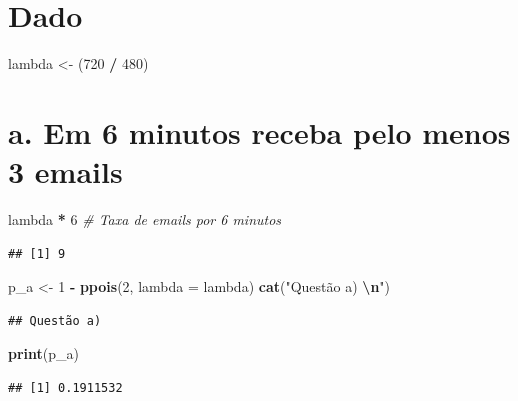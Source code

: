 \documentclass[
]{article}
\newenvironment{Shaded}{\begin{snugshade}}{\end{snugshade}}
\newcommand{\AttributeTok}[1]{\textcolor[rgb]{0.13,0.29,0.53}{#1}}
\newcommand{\CommentTok}[1]{\textcolor[rgb]{0.56,0.35,0.01}{\textit{#1}}}
\newcommand{\DecValTok}[1]{\textcolor[rgb]{0.00,0.00,0.81}{#1}}
\newcommand{\FunctionTok}[1]{\textcolor[rgb]{0.13,0.29,0.53}{\textbf{#1}}}
\newcommand{\NormalTok}[1]{#1}
\newcommand{\OtherTok}[1]{\textcolor[rgb]{0.56,0.35,0.01}{#1}}
\newcommand{\SpecialCharTok}[1]{\textcolor[rgb]{0.81,0.36,0.00}{\textbf{#1}}}
\newcommand{\StringTok}[1]{\textcolor[rgb]{0.31,0.60,0.02}{#1}}
\begin{document}
\section{Dado}\label{dado}

\begin{Shaded}
\begin{Highlighting}[]
\NormalTok{lambda }\OtherTok{\textless{}{-}}\NormalTok{ (}\DecValTok{720} \SpecialCharTok{/} \DecValTok{480}\NormalTok{)}
\end{Highlighting}
\end{Shaded}

\section{a. Em 6 minutos receba pelo menos 3
emails}\label{a.-em-6-minutos-receba-pelo-menos-3-emails}

\begin{Shaded}
\begin{Highlighting}[]
\NormalTok{lambda }\SpecialCharTok{*} \DecValTok{6}  \CommentTok{\# Taxa de emails por 6 minutos}
\end{Highlighting}
\end{Shaded}

\begin{verbatim}
## [1] 9
\end{verbatim}

\begin{Shaded}
\begin{Highlighting}[]
\NormalTok{p\_a }\OtherTok{\textless{}{-}} \DecValTok{1} \SpecialCharTok{{-}} \FunctionTok{ppois}\NormalTok{(}\DecValTok{2}\NormalTok{, }\AttributeTok{lambda =}\NormalTok{ lambda)}
\FunctionTok{cat}\NormalTok{(}\StringTok{"Questão a) }\SpecialCharTok{\textbackslash{}n}\StringTok{"}\NormalTok{)}
\end{Highlighting}
\end{Shaded}

\begin{verbatim}
## Questão a)
\end{verbatim}

\begin{Shaded}
\begin{Highlighting}[]
\FunctionTok{print}\NormalTok{(p\_a)}
\end{Highlighting}
\end{Shaded}

\begin{verbatim}
## [1] 0.1911532
\end{verbatim}
\end{document}

